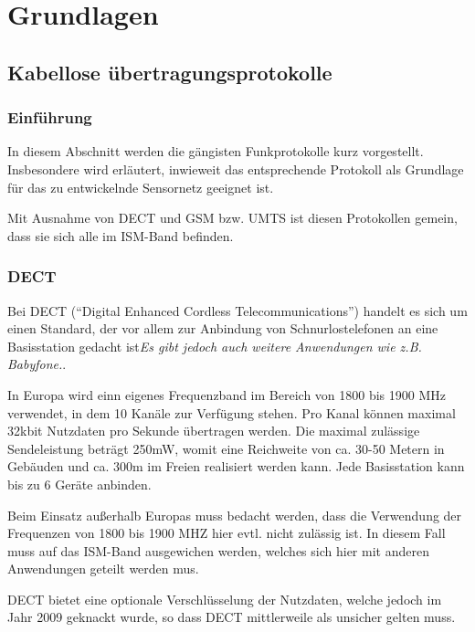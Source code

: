 
\chapter{Grundlagen}\label{Grundlagen}

\section{Kabellose übertragungsprotokolle}
\subsection{Einführung}
In diesem Abschnitt werden die gängisten Funkprotokolle kurz vorgestellt. Insbesondere wird erläutert,
inwieweit das entsprechende Protokoll als Grundlage für das zu entwickelnde Sensornetz geeignet ist.

Mit Ausnahme von DECT und GSM bzw. UMTS ist diesen Protokollen gemein, dass sie sich alle im ISM-Band 
befinden. 

\subsection{DECT}

Bei DECT ("`Digital Enhanced Cordless Telecommunications"') handelt es sich um einen Standard, 
der vor allem zur Anbindung von Schnurlostelefonen an eine Basisstation gedacht ist\textsl{Es gibt
jedoch auch weitere Anwendungen wie z.B. Babyfone.}. 

In Europa wird einn eigenes Frequenzband im Bereich von 1800 bis 1900 MHz verwendet, in dem 10 
Kanäle zur Verfügung stehen. Pro Kanal können maximal 32kbit Nutzdaten pro Sekunde übertragen
werden. Die maximal zulässige Sendeleistung beträgt 250mW, womit eine Reichweite von ca. 30-50
Metern in Gebäuden und ca. 300m im Freien realisiert werden kann. Jede Basisstation kann
bis zu 6 Geräte anbinden.

Beim Einsatz außerhalb Europas muss bedacht werden, dass die Verwendung der Frequenzen von
1800 bis 1900 MHZ hier evtl. nicht zulässig ist. In diesem Fall muss auf das ISM-Band 
ausgewichen werden, welches sich hier mit anderen Anwendungen geteilt werden mus.

DECT bietet eine optionale Verschlüsselung der Nutzdaten, welche jedoch im Jahr 2009 geknackt
wurde, so dass DECT mittlerweile als unsicher gelten muss.


